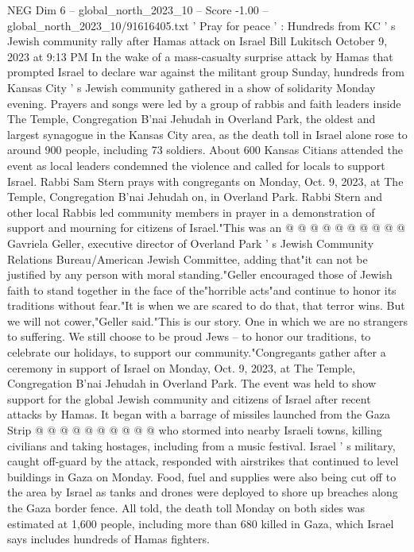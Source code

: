 \begin{textsample}{NEG Dim 6 – global\_north\_2023\_10 – Score -1.00 – global\_north\_2023\_10/91616405.txt}  \label{ex:f6_neg_251}
' Pray for peace ' : Hundreds from KC ' s Jewish community rally after Hamas attack on Israel Bill Lukitsch October 9, 2023 at 9:13 PM In the wake of a mass-casualty surprise attack by Hamas that prompted Israel to declare war against the militant group Sunday, hundreds from Kansas City ' s Jewish community gathered in a show of solidarity Monday evening.
Prayers and songs were led by a group of rabbis and faith leaders inside The Temple, Congregation B'nai Jehudah in Overland Park, the oldest and largest synagogue in the Kansas City area, as the death toll in Israel alone rose to around 900 people, including 73 soldiers.
About 600 Kansas Citians attended the event as local leaders condemned the violence and called for locals to support Israel.
Rabbi Sam Stern prays with congregants on Monday, Oct. 9, 2023, at The Temple, Congregation B'nai Jehudah on, in Overland Park.
Rabbi Stern and other local Rabbis led community members in prayer in a demonstration of support and mourning for citizens of Israel."This was an @ @ @ @ @ @ @ @ @ @ Gavriela Geller, executive director of Overland Park ' s Jewish Community Relations Bureau/American Jewish Committee, adding that"it can not be justified by any person with moral standing."Geller encouraged those of Jewish faith to stand together in the face of the"horrible acts"and continue to honor its traditions without fear."It is when we are scared to do that, that terror wins.
But we will not cower,"Geller said."This is our story.
One in which we are no strangers to suffering.
We still choose to be proud Jews -- to honor our traditions, to celebrate our holidays, to support our community."Congregants gather after a ceremony in support of Israel on Monday, Oct. 9, 2023, at The Temple, Congregation B'nai Jehudah in Overland Park.
The event was held to show support for the global Jewish community and citizens of Israel after recent attacks by Hamas.
It began with a barrage of missiles launched from the Gaza Strip @ @ @ @ @ @ @ @ @ @ who stormed into nearby Israeli towns, killing civilians and taking hostages, including from a music festival.
Israel ' s military, caught off-guard by the attack, responded with airstrikes that continued to level buildings in Gaza on Monday.
Food, fuel and supplies were also being cut off to the area by Israel as tanks and drones were deployed to shore up breaches along the Gaza border fence.
All told, the death toll Monday on both sides was estimated at 1,600 people, including more than 680 killed in Gaza, which Israel says includes hundreds of Hamas fighters.

\end{textsample}
